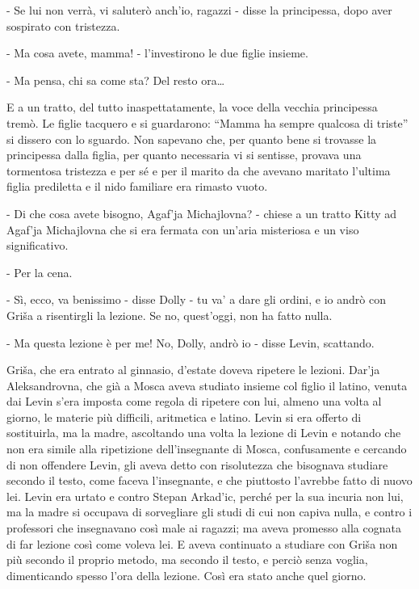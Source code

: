- Se lui non verrà, vi saluterò anch'io, ragazzi - disse la principessa, dopo aver sospirato con tristezza. 

- Ma cosa avete, mamma! - l'investirono le due figlie insieme. 

- Ma pensa, chi sa come sta? Del resto ora\ldots{} 

E a un tratto, del tutto inaspettatamente, la voce della vecchia principessa tremò. Le figlie tacquero e si guardarono: ``Mamma ha sempre qualcosa di triste'' si dissero con lo sguardo. Non sapevano che, per quanto bene si trovasse la principessa dalla figlia, per quanto necessaria vi si sentisse, provava una tormentosa tristezza e per sé e per il marito da che avevano maritato l'ultima figlia prediletta e il nido familiare era rimasto vuoto. 

- Di che cosa avete bisogno, Agaf'ja Michajlovna? - chiese a un tratto Kitty ad Agaf'ja Michajlovna che si era fermata con un'aria misteriosa e un viso significativo. 

- Per la cena. 
\enlargethispage*{1\baselineskip}

- Sì, ecco, va benissimo - disse Dolly - tu va' a dare gli ordini, e io andrò con Griša a risentirgli la lezione. Se no, quest'oggi, non ha fatto nulla. 

- Ma questa lezione è per me! No, Dolly, andrò io - disse Levin, scattando. 

Griša, che era entrato al ginnasio, d'estate doveva ripetere le lezioni. Dar'ja Aleksandrovna, che già a Mosca aveva studiato insieme col figlio il latino, venuta dai Levin s'era imposta come regola di ripetere con lui, almeno una volta al giorno, le materie più difficili, aritmetica e latino. Levin si era offerto di sostituirla, ma la madre, ascoltando una volta la lezione di Levin e notando che non era simile alla ripetizione dell'insegnante di Mosca, confusamente e cercando di non offendere Levin, gli aveva detto con risolutezza che bisognava studiare secondo il testo, come faceva l'insegnante, e che piuttosto l'avrebbe fatto di nuovo lei. Levin era urtato e contro Stepan Arkad'ic, perché per la sua incuria non lui, ma la madre si occupava di sorvegliare gli studi di cui non capiva nulla, e contro i professori che insegnavano così male ai ragazzi; ma aveva promesso alla cognata di far lezione così come voleva lei. E aveva continuato a studiare con Griša non più secondo il proprio metodo, ma secondo il testo, e perciò senza voglia, dimenticando spesso l'ora della lezione. Così era stato anche quel giorno. 

